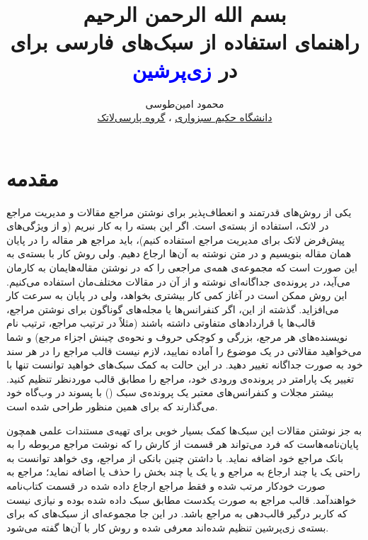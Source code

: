 \documentclass[a4paper]{article}
\title{\vspace{-2cm}
{\small بسم الله الرحمن الرحيم\\}
\vspace{2cm}
 راهنمای استفاده از سبک‌های فارسی  برای \textcolor{red}{\lr{\textsc{Bib}\TeX}}\\
 در \textcolor{blue}{زی‌پرشین}\\
\lr{(Persian-bib User Guide)}
}
\author{محمود امین‌طوسی\\
\href{http://profs.hsu.ac.ir/mamintoosi}{دانشگاه حکیم سبزواری} 
،
\href{http://www.parsilatex.com}{گروه پارسی‌لاتک}
}
\theoremstyle{plain}\newtheorem{question}{پرسش}
\begin{document}
\maketitle
\tableofcontents

\section{مقدمه}

یکی از روش‌های قدرتمند و انعطاف‌پذیر برای نوشتن مراجع مقالات و مدیریت مراجع در لاتک، استفاده از بسته‌ی  است.
اگر این بسته را به کار نبریم (و از ویژگی‌های پیش‌فرض لاتک برای مدیریت مراجع استفاده کنیم)، باید مراجع هر مقاله را در پایان همان مقاله بنویسیم
و در متن نوشته به آن‌ها ارجاع دهیم. ولی روش کار با بسته‌ی  به این صورت است که مجموعه‌ی همه‌ی مراجعی را که در نوشتن مقاله‌هایمان به کارمان می‌آید، 
در پرونده‌ی جداگانه‌ای نوشته و از آن در مقالات مختلف‌مان استفاده می‌کنیم.  این روش ممکن است در آغاز کمی کار بیشتری بخواهد، ولی در پایان به سرعت کار می‌افزاید.
گذشته از این، اگر  کنفرانس‌ها یا مجله‌های گوناگون برای نوشتن مراجع، قالب‌ها یا قراردادهای متفاوتی داشته باشند
 (مثلاً در ترتیب مراجع، ترتیب نام نویسنده‌های هر مرجع، بزرگی و کوچکی حروف و نحوه‌ی چینش اجزاء مرجع) و شما می‌خواهید مقالاتی در یک موضوع را آماده نمایید،
 لازم نیست قالب مراجع را در هر سند خود به صورت جداگانه تغییر دهید. 
 در این حالت به کمک سبک‌های  خواهید توانست تنها با تغییر یک پارامتر در پرونده‌ی ورودی خود، مراجع را مطابق قالب موردنظر تنظیم کنید. 
 بیشتر مجلات و کنفرانس‌های معتبر یک پرونده‌ی سبک () با پسوند  در وب‌گاه خود می‌گذارند که برای همین منظور طراحی شده است.

به جز نوشتن مقالات این سبک‌ها کمک بسیار خوبی برای تهیه‌ی مستندات علمی همچون پایان‌نامه‌هاست که فرد می‌تواند هر قسمت از کارش را که نوشت مراجع مربوطه
را به بانک مراجع خود اضافه نماید. با داشتن چنین بانکی از مراجع، وی خواهد توانست به راحتی یک یا چند ارجاع به مراجع و یا یک یا چند بخش را حذف یا اضافه ‌نماید؛ 
مراجع به صورت خودکار مرتب شده و فقط مراجع ارجاع داده شده در قسمت کتاب‌نامه خواهندآمد. قالب مراجع به صورت یکدست مطابق سبک داده شده بوده و نیازی نیست
که کاربر درگیر قالب‌دهی به مراجع باشد. 
در این جا مجموعه‌ای از سبک‌های  که برای بسته‌ی زی‌پرشین تنظیم شده‌اند معرفی شده و روش کار با آن‌ها گفته می‌شود.
\end{document}
